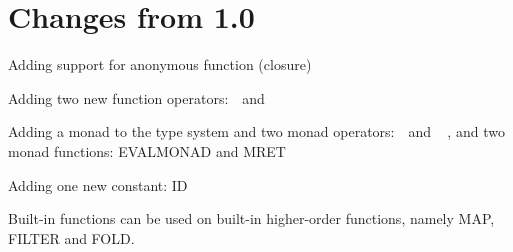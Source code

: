 \chapter{Changes from 1.0}

\begin{itemlist}
\item Adding support for anonymous function (closure)
\item Adding two new function operators: \basicapply\ \,and\ \,\basiccompo
\item Adding a monad to the type system and two monad operators: \basicmbind\ \,and\ \,\basicmseq\ , and two monad functions: EVALMONAD and MRET
\item Adding one new constant: ID
\item Built-in functions can be used on built-in higher-order functions, namely MAP, FILTER and FOLD.
\end{itemlist}
